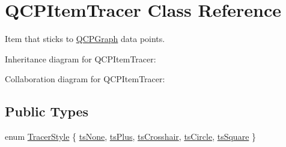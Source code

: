 \hypertarget{classQCPItemTracer}{}\section{Q\+C\+P\+Item\+Tracer Class Reference}
\label{classQCPItemTracer}


Item that sticks to \hyperlink{classQCPGraph}{Q\+C\+P\+Graph} data points.  




Inheritance diagram for Q\+C\+P\+Item\+Tracer\+:


Collaboration diagram for Q\+C\+P\+Item\+Tracer\+:
\subsection*{Public Types}
\begin{DoxyCompactItemize}
\item 
enum \hyperlink{classQCPItemTracer_a2f05ddb13978036f902ca3ab47076500}{Tracer\+Style} \{ \newline
\hyperlink{classQCPItemTracer_a2f05ddb13978036f902ca3ab47076500aac27462c79146225bfa8fba24d2ee8a4}{ts\+None}, 
\hyperlink{classQCPItemTracer_a2f05ddb13978036f902ca3ab47076500a3323fb04017146e4885e080a459472fa}{ts\+Plus}, 
\hyperlink{classQCPItemTracer_a2f05ddb13978036f902ca3ab47076500af562ec81ac3ba99e26ef8540cf1ec16f}{ts\+Crosshair}, 
\hyperlink{classQCPItemTracer_a2f05ddb13978036f902ca3ab47076500ae2252c28f4842880d71e9f94e69de94e}{ts\+Circle}, 
\newline
\hyperlink{classQCPItemTracer_a2f05ddb13978036f902ca3ab47076500a4ed5f01f2c5fd86d980366d79f481b9b}{ts\+Square}
 \}
\end{DoxyCompactItemize}

